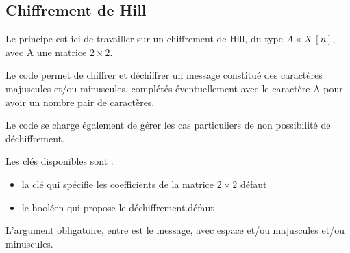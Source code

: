 \begin{PresCodePL}{}
\end{PresCodePL}

\subsection{Chiffrement de Hill}

\begin{tipblock}
Le principe est ici de travailler sur un chiffrement de Hill, du type $A\times X \: [n]$, avec A une matrice $2\times2$.

\smallskip

Le code permet de chiffrer et déchiffrer un message constitué des caractères majuscules et/ou minuscules, complétés éventuellement avec le caractère A pour avoir un nombre pair de caractères.

\smallskip

Le code se charge également de gérer les cas particuliers de non possibilité de déchiffrement.
\end{tipblock}

\begin{PresCodePL}{}
\end{PresCodePL}

\begin{cautionblock}
Les clés disponibles sont :

\begin{itemize}
	\item la clé  qui spécifie les coefficients de la matrice $2\times2$ \hfill{}défaut 
	\item le booléen  qui propose le déchiffrement.\hfill{}défaut 
\end{itemize}

L'argument obligatoire, entre  est le message, avec espace et/ou majuscules et/ou minuscules.
\end{cautionblock}

\begin{PresCodePL}{}
\end{PresCodePL}

\begin{PresCodePL}{}
\end{PresCodePL}

\begin{PresCodePL}{}
\end{PresCodePL}

